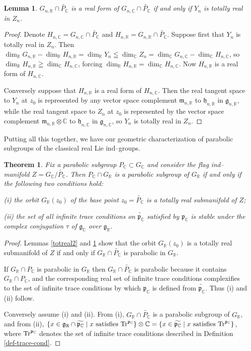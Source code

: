 \documentclass[oneside,leqno,11pt]{article}
\def\gg{\mathfrak{g}}
\def\gh{\mathfrak{h}}
\def\gm{\mathfrak{m}}
\def\gp{\mathfrak{p}}
\def\Tr{{\rm Tr}}
\def\C{\mathbb{C}}
\def\R{\mathbb{R}}
\newtheorem{theorem}[equation]{Theorem}
\newtheorem{lemma}[equation]{Lemma}
\begin{document}
\begin{lemma} \label{totreal3}
$G_{n,\R}\cap \widetilde{P_\C}$ is a real form of 
$G_{n,\C}\cap \widetilde{P_\C}$ if and only if $Y_n$ is totally real in $Z_n$.
\end{lemma}

\begin{proof}
Denote $H_{n,\C} = G_{n,\C}\cap \widetilde{P_\C}$ and 
$H_{n,\R} = G_{n,\R}\cap \widetilde{P_\C}$.
Suppose first that $Y_n$ is totally real in $Z_n$.  Then 
$\dim_\R G_{n,\R} - \dim_\R H_{n,\R} = \dim_\R Y_n \leqq \dim_\C Z_n
= \dim_\C G_{n,\C} - \dim_\C H_{n,\C}$, so $\dim_\R H_{n,\R} \geqq
\dim_\C H_{n,\C}$, forcing $\dim_\R H_{n,\R} = \dim_\C H_{n,\C}$.  
Now $H_{n,\R}$ is a real form of $H_{n,\C}$.

Conversely suppose that $H_{n,\R}$ is a real form of $H_{n,\C}$.  Then
the real tangent space to $Y_n$ at $z_0$ is represented by any vector
space complement $\gm_{n,\R}$ to $\gh_{n,\R}$ in $\gg_{n,\R}$, while the
real tangent space to $Z_n$ at $z_0$ is represented by the vector
space complement $\gm_{n,\R}\otimes\C$ to $\gh_{n,\C}$ in $\gg_{n,\C}$,
so $Y_n$ is totally real in $Z_n$. 
\end{proof}


Putting all this together, we have our geometric characterization of
parabolic subgroups of the classical real Lie ind--groups.


\begin{theorem}\label{characterization}
Fix a parabolic subgroup $P_\C \subset G_\C$ and consider the 
flag ind--manifold $Z = G_\C/\widetilde{P_\C}$.  Then $P_\C\cap G_\R$
is a parabolic subgroup of $G_\R$ if and only if the following two conditions hold:

{\rm (i)} the orbit $G_\R(z_0)$ of the base point $z_0 = \widetilde{P_\C}$ 
is a totally real submanifold of $Z$;

{\rm (ii)} the set of all infinite trace
conditions on $\widetilde{\gp_\C}$ satisfied by $\gp_\C$ is stable under the
complex conjugation $\tau$ of $\gg_\C$ over $\gg_\R$.
\end{theorem}

\begin{proof}
Lemmas \ref{totreal2} and \ref{totreal3} show that the orbit
$G_\R(z_0)$ is a totally real submanifold of $Z$
if and only if $G_\R \cap \widetilde{P_\C}$ is parabolic in $G_\R$.

If $G_\R \cap P_\C$ is parabolic in $G_\R$ then $G_\R \cap \widetilde{P_\C}$ 
is parabolic
because it contains $G_\R \cap P_\C$, and the corresponding real set of 
infinite trace 
conditions complexifies to the set of infinite trace conditions by which
$\gp_\C$ is defined from $\widetilde{\gp_\C}$.  Thus (i) and (ii) follow.

Conversely assume (i) and (ii).  From (i), $G_\R \cap \widetilde{P_\C}$
is a parabolic subgroup of $G_\R$, and from (ii),
$\{x \in \gg_\R \cap \widetilde{\gp_\C} \mid x \text{ satisfies }
\Tr^{\gp_\C}\}\otimes \C = \{x \in \widetilde{\gp_\C} \mid x \text{ satisfies }
\Tr^{\gp_\C}\}$, where $\Tr^{\gp_\C}$ denotes the set of infinite trace 
conditions described in Definition \ref{def-trace-cond}.
\end{proof}
\end{document}
